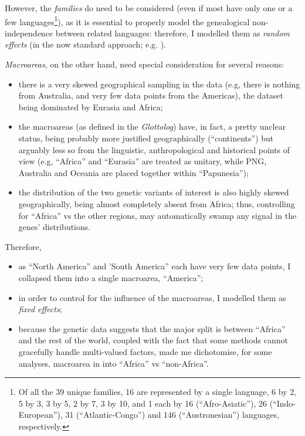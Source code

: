 \documentclass[twoside,onecolumn]{article}
\begin{document}
However, the \emph{families} do need to be considered (even if most have only one or a few languages\footnote{Of all the 39 unique families, 16 are represented by a single language, 6 by 2, 5 by 3, 3 by 5, 2 by 7, 3 by 10, and 1 each by 16 (``Afro-Asiatic''), 26 (``Indo-European''), 31 (``Atlantic-Congo'') and 146 (``Austronesian'') languages, respectively.}), as it is essential to properly model the genealogical non-independence between related languages: therefore, I modelled them as \emph{random effects} (in the now standard approach; e.g. \citealp{ladd_correlational_2015}).

\emph{Macroareas}, on the other hand, need special consideration for several reasons:

\begin{itemize}
  \item there is a very skewed geographical sampling in the data (e.g, there is nothing from Australia, and very few data points from the Americas), the dataset being dominated by Eurasia and Africa;
  \item the macroareas (as defined in the \textit{Glottolog}) have, in fact, a pretty unclear status, being probably more justified geographically (``continents'') but arguably less so from the linguistic, anthropological and historical points of view (e.g, ``Africa'' and ``Eurasia'' are treated as unitary, while PNG, Australia and Oceania are placed together within ``Papunesia'');
  \item the distribution of the two genetic variants of interest is also highly skewed geographically, being almost completely absent from Africa; thus, controlling for ``Africa'' vs the other regions, may automatically swamp any signal in the genes’ distributions.
\end{itemize}

Therefore,

\begin{itemize}
  \item as ``North America'' and 'South America'' each have very few data points, I collapsed them into a single macroarea, ``America'';
  \item in order to control for the influence of the macroareas, I modelled them as \emph{fixed effects};
  \item because the genetic data suggests that the major split is between ``Africa'' and the rest of the world, coupled with the fact that some methods cannot gracefully handle multi-valued factors, made me dichotomise, for some analyses, macroarea in into ``Africa'' vs ``non-Africa''.
\end{itemize}
\end{document}
